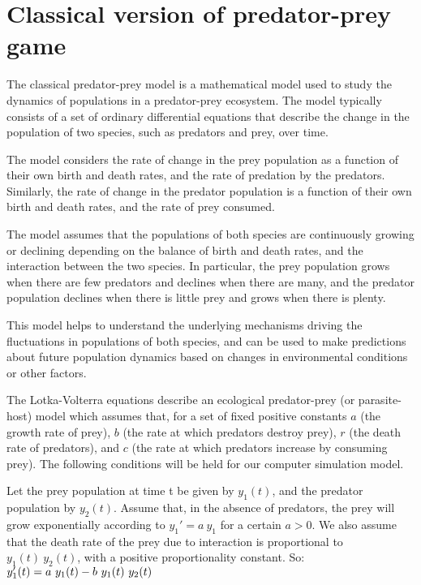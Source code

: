 \section{Classical version of predator-prey game}


The classical predator-prey model is a mathematical model used to study the dynamics of populations in a predator-prey ecosystem. The model typically consists of a set of ordinary differential equations that describe the change in the population of two species, such as predators and prey, over time.

The model considers the rate of change in the prey population as a function of their own birth and death rates, and the rate of predation by the predators. Similarly, the rate of change in the predator population is a function of their own birth and death rates, and the rate of prey consumed.

The model assumes that the populations of both species are continuously growing or declining depending on the balance of birth and death rates, and the interaction between the two species. In particular, the prey population grows when there are few predators and declines when there are many, and the predator population declines when there is little prey and grows when there is plenty.

This model helps to understand the underlying mechanisms driving the fluctuations in populations of both species, and can be used to make predictions about future population dynamics based on changes in environmental conditions or other factors.

The Lotka-Volterra equations describe an ecological predator-prey (or parasite-host) model which assumes that, for a set of fixed positive constants \(a\) (the growth rate of prey), \(b\) (the rate at which predators destroy prey), \(r\) (the death rate of predators), and \(c\) (the rate at which predators increase by consuming prey). The following conditions will be held for our computer simulation model.

Let the prey population at time t be given by \(y_1(t)\), and the predator population by \(y_2(t)\). Assume that, in the absence of predators, the prey will grow exponentially according to \(y_1' = a \ y_1\) for a certain \(a > 0\). We also assume that the death rate of the prey due to interaction is proportional to \(y_1(t) \ y_2(t)\), with a positive proportionality constant. So:
\(\\ y_1' (t) = a\ y_1(t) - b\ y_1(t)\ y_2(t)   \)

